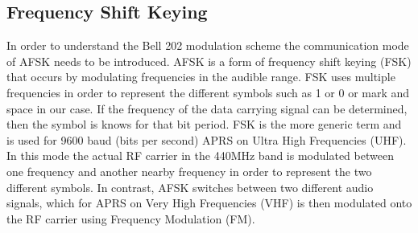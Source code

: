 \subsection{Frequency Shift Keying}
In order to understand the Bell 202 modulation scheme the communication mode of AFSK needs to be introduced. AFSK is a form of frequency shift keying (FSK) that occurs by modulating frequencies in the audible range. FSK uses multiple frequencies in order to represent the different symbols such as 1 or 0 or mark and space in our case. If the frequency of the data carrying signal can be determined, then the symbol is knows for that bit period. FSK is the more generic term and is used for 9600 baud (bits per second) APRS on Ultra High Frequencies (UHF). In this mode the actual RF carrier in the 440MHz band is modulated between one frequency and another nearby frequency in order to represent the two different symbols. In contrast, AFSK switches between two different audio signals, which for APRS on Very High Frequencies (VHF) is then modulated onto the RF carrier using Frequency Modulation (FM).


